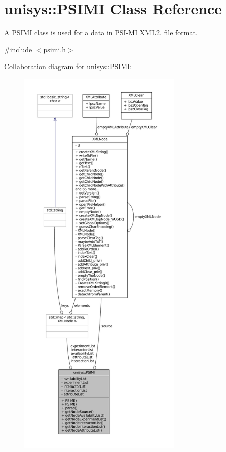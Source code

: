 \hypertarget{classunisys_1_1PSIMI}{\section{unisys\-:\-:P\-S\-I\-M\-I Class Reference}
\label{classunisys_1_1PSIMI}
}


A \hyperlink{classunisys_1_1PSIMI}{P\-S\-I\-M\-I} class is used for a data in P\-S\-I-\/\-M\-I X\-M\-L2. file format.  




{\ttfamily \#include $<$psimi.\-h$>$}



Collaboration diagram for unisys\-:\-:P\-S\-I\-M\-I\-:
\nopagebreak
\begin{figure}[H]
\begin{center}
\leavevmode
\includegraphics[height=550pt]{classunisys_1_1PSIMI__coll__graph}
\end{center}
\end{figure}

